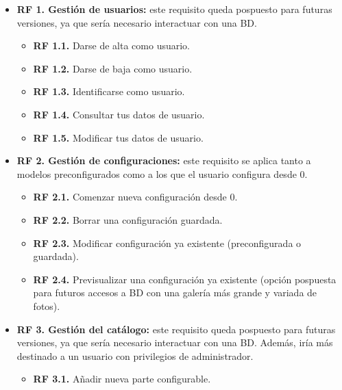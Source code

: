 \begin{itemize}
    \item \textbf{RF 1. Gestión de usuarios:} este requisito queda pospuesto para futuras versiones, ya que sería necesario interactuar con una BD.
    \begin{itemize}
        \item \textbf{RF 1.1.} Darse de alta como usuario.
        \item \textbf{RF 1.2.} Darse de baja como usuario.
        \item \textbf{RF 1.3.} Identificarse como usuario.
        \item \textbf{RF 1.4.} Consultar tus datos de usuario.
        \item \textbf{RF 1.5.} Modificar tus datos de usuario.
    \end{itemize}
    \item \textbf{RF 2. Gestión de configuraciones: } este requisito se aplica tanto a modelos preconfigurados como a los que el usuario configura desde 0.
    \begin{itemize}
        \item \textbf{RF 2.1.} Comenzar nueva configuración desde 0.
        \item \textbf{RF 2.2.} Borrar una configuración guardada.
        \item \textbf{RF 2.3.} Modificar configuración ya existente (preconfigurada o guardada).
        \item \textbf{RF 2.4.} Previsualizar una configuración ya existente (opción pospuesta para futuros accesos a BD con una galería más grande y variada de fotos).
    \end{itemize}
    \item \textbf{RF 3. Gestión del catálogo:} este requisito queda pospuesto para futuras versiones, ya que sería necesario interactuar con una BD. Además, iría más destinado a un usuario con privilegios de administrador.
    \begin{itemize}
        \item \textbf{RF 3.1.} Añadir nueva parte configurable.

\end{itemize}
\end{itemize}
